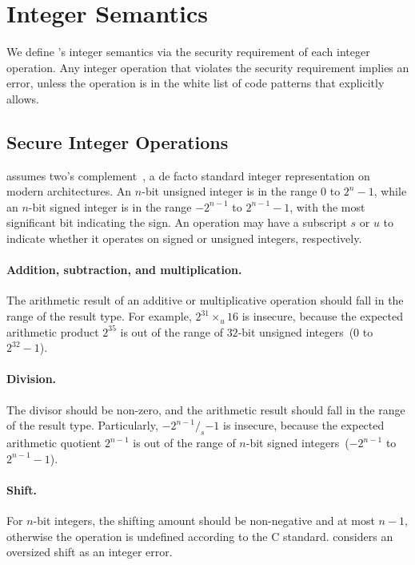 \section{Integer Semantics}
\label{s:sema}

We define \sys's integer semantics via the security requirement of
each integer operation.  Any integer operation that violates the
security requirement implies an error, unless the operation is in
the white list of code patterns that \sys explicitly allows.

\subsection{Secure Integer Operations}
\label{s:sema:sec}

\sys assumes two's complement~\cite[\chapterautorefname~4.2.1]{intel:vol1},
a de facto standard integer representation on modern architectures.
An $n$-bit unsigned integer is in the range $0$ to $2^n-1$, while
an $n$-bit signed integer is in the range $-2^{n-1}$ to $2^{n-1}-1$,
with the most significant bit indicating the sign.  An operation
may have a subscript $s$ or $u$ to indicate whether it operates on
signed or unsigned integers, respectively.

\paragraph{Addition, subtraction, and multiplication.}
The arithmetic result of an additive or multiplicative operation should fall
in the range of the result type.  For example,
$2^{31}\times_u 16$ is insecure,
because the expected arithmetic product $2^{35}$ is out of the range
of $32$-bit unsigned integers~($0$ to $2^{32} - 1$).

\paragraph{Division.}
The divisor should be non-zero,
and the arithmetic result should fall in the range of the result type.
Particularly, $-2^{n-1} /_s {-1}$ is insecure,
because the expected arithmetic quotient $2^{n-1}$ is out of
the range of $n$-bit signed integers~($-2^{n-1}$ to $2^{n-1}-1$).

\paragraph{Shift.}
For $n$-bit integers, the shifting amount should be non-negative
and at most $n-1$, otherwise the operation is undefined according
to the C standard.
\sys considers an oversized shift as an integer error.

